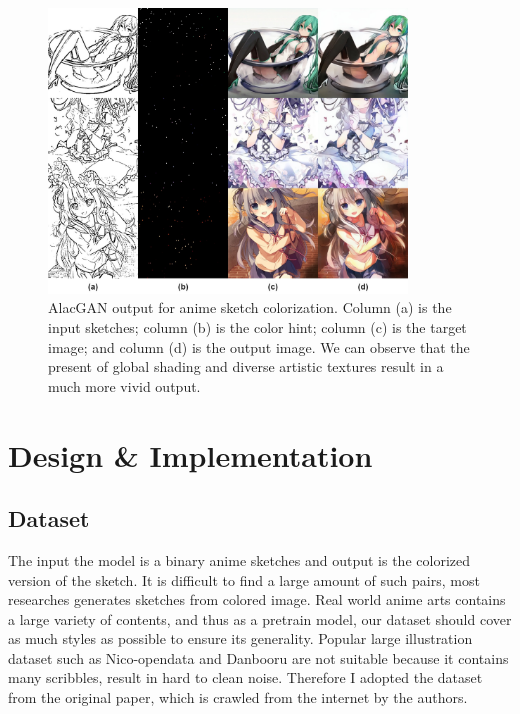 \begin{figure}
    \centering
    \includegraphics[width=0.85\textwidth]{images/colorization/alacgan.jpg}
    \caption{AlacGAN output for anime sketch colorization. Column (a) is the input sketches; column (b) is the color hint; column (c) is the target image; and column (d) is the output image. We can observe that the present of global shading and diverse artistic textures result in a much more vivid output.}
    \label{fig:colorization_alacgan}
\end{figure}

\section{Design \& Implementation}

\subsection{Dataset}
The input the model is a binary anime sketches and output is the colorized version of the sketch. It is difficult to find a large amount of such pairs, most researches generates sketches from colored image. Real world anime arts contains a large variety of contents, and thus as a pretrain model, our dataset should cover as much styles as possible to ensure its generality. Popular large illustration dataset such as Nico-opendata\cite{Undefineda} and Danbooru\cite{branwenDanbooru2021LargeScaleCrowdsourced2015} are not suitable because it contains many scribbles, result in hard to clean noise. Therefore I adopted the dataset from the original paper, which is crawled from the internet by the authors.

